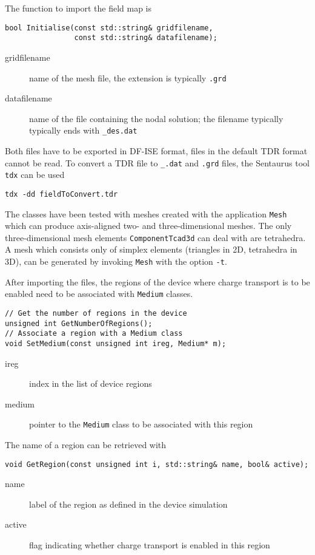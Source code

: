 The function to import the field map is 
\begin{lstlisting}
bool Initialise(const std::string& gridfilename,
                const std::string& datafilename);
\end{lstlisting}
\begin{description}
  \item[gridfilename]
  name of the mesh file, the extension is typically \texttt{.grd}
  \item[datafilename]
  name of the file containing the nodal solution;
  the filename typically typically ends with \texttt{\_des.dat}
\end{description}

Both files have to be exported in DF-ISE format, 
files in the default TDR format cannot be read.
To convert a TDR file to \texttt{\_.dat} and \texttt{.grd} files, the
Sentaurus tool \texttt{tdx} can be used
\begin{lstlisting}
tdx -dd fieldToConvert.tdr
\end{lstlisting}

The classes have been tested with meshes created with the application 
\texttt{Mesh} which can produce axis-aligned 
two- and three-dimensional meshes.
The only three-dimensional mesh elements \texttt{ComponentTcad3d} 
can deal with are tetrahedra. 
A mesh which consists only of simplex elements 
(triangles in 2D, tetrahedra in 3D), 
can be generated by invoking \texttt{Mesh} with the option \texttt{-t}.

After importing the files, 
the regions of the device where charge transport is to be enabled 
need to be associated with \texttt{Medium} classes. 
\begin{lstlisting}
// Get the number of regions in the device
unsigned int GetNumberOfRegions();
// Associate a region with a Medium class
void SetMedium(const unsigned int ireg, Medium* m);
\end{lstlisting}
\begin{description}
  \item[ireg]
  index in the list of device regions
  \item[medium]
  pointer to the \texttt{Medium} class to be associated with this region
\end{description}

The name of a region can be retrieved with
\begin{lstlisting}
void GetRegion(const unsigned int i, std::string& name, bool& active);
\end{lstlisting}
\begin{description}
  \item[name] 
  label of the region as defined in the device simulation
  \item[active] 
  flag indicating whether charge transport is enabled 
  in this region
\end{description}

